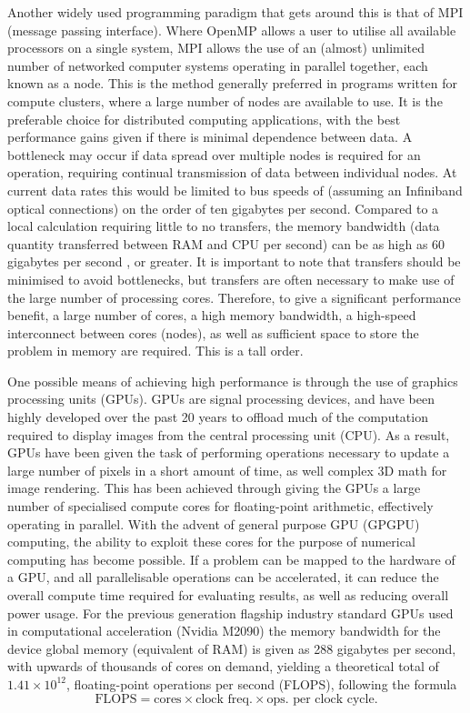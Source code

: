 Another widely used programming paradigm that gets around this is that of MPI (message passing interface). Where OpenMP allows a user to utilise all available processors on a single system, MPI allows the use of an (almost) unlimited number of networked computer systems operating in parallel together, each known as a node. This is the method generally preferred in programs written for compute clusters, where a large number of nodes are available to use. It is the preferable choice for distributed computing applications, with the best performance gains given if there is minimal dependence between data. A bottleneck may occur if data spread over multiple nodes is required for an operation, requiring continual transmission of data between individual nodes. At current data rates this would be limited to bus speeds of (assuming an Infiniband optical connections) on the order of ten gigabytes per second. Compared to a local calculation requiring little to no transfers, the memory bandwidth (data quantity transferred between RAM and CPU per second) can be as high as 60 gigabytes per second \cite{DAT:Intel_xeon}, or greater. It is important to note that transfers should be minimised to avoid bottlenecks, but transfers are often necessary to make use of the large number of processing cores. Therefore, to give a significant performance benefit, a large number of cores, a high memory bandwidth, a high-speed interconnect between cores (nodes), as well as sufficient space to store the problem in memory are required. This is a tall order.

One possible means of achieving high performance is through the use of graphics processing units (GPUs). GPUs are signal processing devices, and have been highly developed over the past 20 years to offload much of the computation required to display images from the central processing unit (CPU). As a result, GPUs have been given the task of performing operations necessary to update a large number of pixels in a short amount of time, as well complex 3D math for image rendering. This has been achieved through giving the GPUs a large number of specialised compute cores for floating-point arithmetic, effectively operating in parallel. With the advent of general purpose GPU (GPGPU) computing, the ability to exploit these cores for the purpose of numerical computing has become possible. If a problem can be mapped to the hardware of a GPU, and all parallelisable operations can be accelerated, it can reduce the overall compute time required for evaluating results, as well as reducing overall power usage. For the previous generation flagship industry standard GPUs used in computational acceleration (Nvidia M2090) the memory bandwidth for the device global memory (equivalent of RAM) is given as 288 gigabytes per second, with upwards of thousands of cores on demand, yielding a theoretical total of $1.41\times10^{12}$, floating-point operations per second (FLOPS), following the formula
\begin{equation}
    \text{FLOPS} = \text{cores}\times\text{clock freq.}\times\text{ops. per clock cycle}.
\end{equation}

